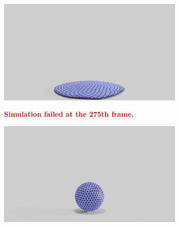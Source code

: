 \begin{figure}
\begin{subfigure}{.16\linewidth}
		{\includegraphics[width=2.0\textwidth]{images/coarse_ball/0495/0250.jpg}}
		\label{sfig:ball-0495-2}
	\end{subfigure}%
	\begin{subfigure}{.16\linewidth} 
		\label{sfig:ball-0495-3}
	\end{subfigure}
	\begin{subfigure}{.48\linewidth}
		\centering
		\textcolor{red}{\textbf{Simulation failed at the 275th frame.}}
	\end{subfigure}\hfill
	\begin{subfigure}{.03\linewidth}
	\end{subfigure}%
	\begin{subfigure}{.16\linewidth}
		\centering
		{\includegraphics[width=2.0\textwidth]{images/coarse_ball/vp/0200.jpg}}

\end{subfigure}
\end{figure}
